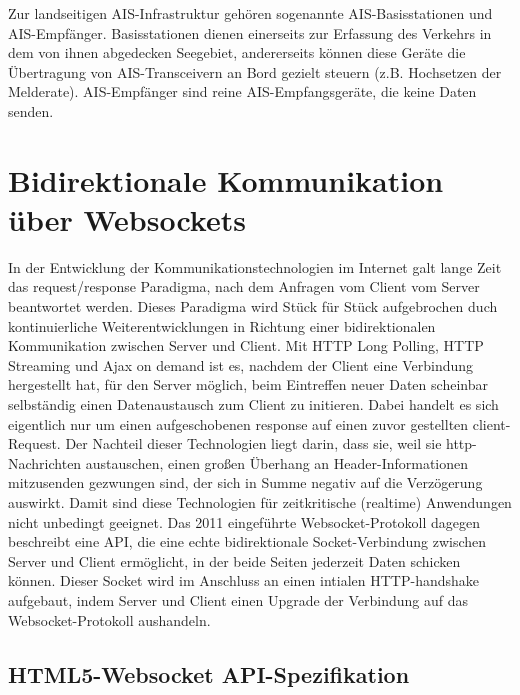 Zur landseitigen AIS-Infrastruktur gehören sogenannte AIS-Basisstationen und AIS-Empfänger. Basisstationen dienen einerseits zur Erfassung des Verkehrs in dem von ihnen abgedecken Seegebiet, andererseits können diese Geräte die Übertragung von AIS-Transceivern an Bord gezielt steuern (z.B. Hochsetzen der Melderate). AIS-Empfänger sind reine AIS-Empfangsgeräte, die keine Daten senden.\\


\section{Bidirektionale Kommunikation über Websockets}\label{s.Bidirektionale Kommunikation über Websockets}

In der Entwicklung der Kommunikationstechnologien im Internet galt lange Zeit das request/response Paradigma, nach dem Anfragen vom Client vom Server beantwortet werden. Dieses Paradigma wird Stück für Stück aufgebrochen duch kontinuierliche Weiterentwicklungen in Richtung einer bidirektionalen Kommunikation zwischen Server und Client.
Mit HTTP Long Polling, HTTP Streaming und Ajax on demand ist es, nachdem der Client eine Verbindung hergestellt hat, für den Server möglich, beim Eintreffen neuer Daten scheinbar selbständig einen Datenaustausch zum Client zu initieren. Dabei handelt es sich eigentlich nur um einen aufgeschobenen response auf einen zuvor gestellten client-Request.
Der Nachteil dieser Technologien liegt darin, dass sie, weil sie http-Nachrichten austauschen, einen großen Überhang an Header-Informationen mitzusenden gezwungen sind, der sich in Summe negativ auf die Verzögerung auswirkt. Damit sind diese Technologien für zeitkritische (realtime) Anwendungen nicht unbedingt geeignet.
Das 2011 eingeführte Websocket-Protokoll dagegen beschreibt eine API, die eine echte bidirektionale Socket-Verbindung zwischen Server und Client ermöglicht, in der beide Seiten jederzeit Daten schicken können. Dieser Socket wird im Anschluss an einen intialen HTTP-handshake aufgebaut, indem Server und Client  einen Upgrade der Verbindung auf das Websocket-Protokoll aushandeln. 


\subsection{HTML5-Websocket API-Spezifikation}


